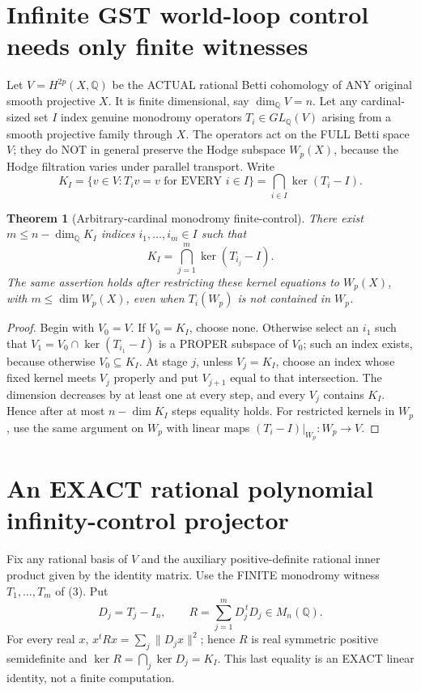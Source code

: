 \documentclass[11pt]{article}
\newtheorem{theorem}{Theorem}
\begin{document}
\section{Infinite GST world-loop control needs only finite witnesses}

Let $V=H^{2p}(X,\mathbb Q)$ be the ACTUAL rational
Betti cohomology of ANY original smooth projective $X$.
It is finite dimensional, say $\dim_{\mathbb Q}V=n$.
Let any cardinal-sized set $I$ index genuine
monodromy operators $T_i\in GL_{\mathbb Q}(V)$
arising from a smooth projective family through $X$.
The operators act on the FULL Betti space $V$;
they do NOT in general preserve the Hodge
subspace $W_p(X)$, because the Hodge filtration
varies under parallel transport.
Write
\[
K_I=\{v\in V:T_i v=v\text{ for EVERY }i\in I\}
=\bigcap_{i\in I}\ker(T_i-I).
\]

\begin{theorem}[Arbitrary-cardinal monodromy finite-control]
There exist $m\le n-\dim_{\mathbb Q}K_I$
indices $i_1,\ldots,i_m\in I$ such that
\[
\boxed{
K_I=\bigcap_{j=1}^m\ker(T_{i_j}-I).
}
\tag{3}
\]
The same assertion holds after restricting
these kernel equations to $W_p(X)$,
with $m\le\dim W_p(X)$, even when
$T_i(W_p)$ is not contained in $W_p$.
\end{theorem}
\begin{proof}
Begin with $V_0=V$. If $V_0=K_I$, choose none.
Otherwise select an $i_1$ such that
$V_1=V_0\cap\ker(T_{i_1}-I)$ is a PROPER
subspace of $V_0$; such an index exists,
because otherwise $V_0\subseteq K_I$.
At stage $j$, unless $V_j=K_I$, choose an
index whose fixed kernel meets $V_j$
properly and put $V_{j+1}$ equal to that
intersection. The dimension decreases
by at least one at every step, and every
$V_j$ contains $K_I$. Hence after at
most $n-\dim K_I$ steps equality holds.
For restricted kernels in $W_p$, use the
same argument on $W_p$ with linear maps
$(T_i-I)|_{W_p}:W_p\to V$.
\end{proof}

\section{An EXACT rational polynomial infinity-control projector}
Fix any rational basis of $V$ and the
auxiliary positive-definite rational inner
product given by the identity matrix.
Use the FINITE monodromy witness
$T_1,\ldots,T_m$ of (3).
Put
\[
D_j=T_j-I_n,\qquad
\boxed{
R=\sum_{j=1}^m D_j^{\,t}D_j\in M_n(\mathbb Q).
}
\tag{4}
\]
For every real $x$, $x^tRx=\sum_j\|D_jx\|^2$;
hence $R$ is real symmetric positive
semidefinite and
$\ker R=\bigcap_j\ker D_j=K_I$.
This last equality is an EXACT linear
identity, not a finite computation.
\end{document}
